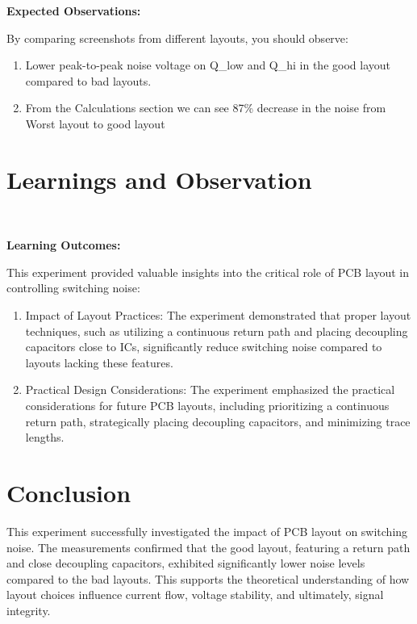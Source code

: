 \documentclass[a4paper,11pt]{article}%
\begin{document}
\textbf{Expected Observations:}

By comparing screenshots from different layouts, you should observe:

\begin{enumerate}
	\item Lower peak-to-peak noise voltage on Q\_low and Q\_hi in the good layout compared to bad layouts.
	\item From the Calculations section we can see 87\% decrease in the noise from Worst layout to good layout
\end{enumerate}




\section{Learnings and Observation}\

\textbf{Learning Outcomes:}

This experiment provided valuable insights into the critical role of PCB layout in controlling switching noise:

\begin{enumerate}
	\item Impact of Layout Practices: The experiment demonstrated that proper layout techniques, such as utilizing a continuous return path and placing decoupling capacitors close to ICs, significantly reduce switching noise compared to layouts lacking these features.

	\item Practical Design Considerations: The experiment emphasized the practical considerations for future PCB layouts, including prioritizing a continuous return path, strategically placing decoupling capacitors, and minimizing trace lengths.
\end{enumerate}





\section{Conclusion}



This experiment successfully investigated the impact of PCB layout on switching noise. The measurements confirmed that the good layout, featuring a return path and close decoupling capacitors, exhibited significantly lower noise levels compared to the bad layouts. This supports the theoretical understanding of how layout choices influence current flow, voltage stability, and ultimately, signal integrity.
\end{document}
